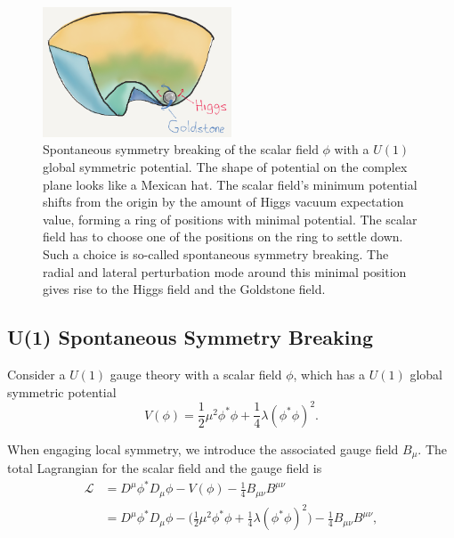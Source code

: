 \begin{figure}[ht]
    \centering
    \includegraphics[width=0.5\textwidth]{chapters/Physics/sectionQFT/figures/Higgs.png}
    \caption{Spontaneous symmetry breaking of the scalar field $\phi$  with a $U(1)$  global symmetric potential. The shape of potential on the complex plane looks like a Mexican hat. The scalar field's minimum potential shifts from the origin by the amount of Higgs vacuum expectation value, forming a ring of positions with minimal potential. The scalar field has to choose one of the positions on the ring to settle down. Such a choice is so-called spontaneous symmetry breaking. The radial and lateral perturbation mode around this minimal position gives rise to the Higgs field and the Goldstone field. }
    \label{fig:physics:qft:higgsPotential}
\end{figure}



\subsection{U(1) Spontaneous Symmetry Breaking}

Consider a $U(1)$ gauge theory with a scalar field $\phi$, which has a $U(1)$ global symmetric potential
\begin{equation}
    V(\phi) = \frac{1}{2} \mu^2 \phi^*\phi + \frac{1}{4}\lambda(\phi^*\phi )^2.
\end{equation}


\noindent When engaging local symmetry, we introduce the associated gauge field $B_{\mu}$. The total Lagrangian for the scalar field and the gauge field is
\begin{equation}
\begin{split}
	\mathcal{L} & = D^\mu\phi^* D_\mu\phi-V(\phi)   - \frac{1}{4}B_{\mu\nu}B^{\mu\nu} \\
	& = D^\mu\phi^* D_\mu\phi- \big(\frac{1}{2} \mu^2 \phi^*\phi + \frac{1}{4} \lambda(\phi^*\phi )^2 \big)   - \frac{1}{4}B_{\mu\nu}B^{\mu\nu},
\end{split}
\label{eqn:physics:qft:u1Higgs}
\end{equation}

